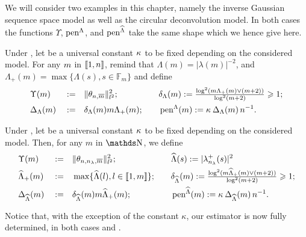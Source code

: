 We will consider two examples in this chapter, namely the inverse Gaussian sequence space model as well as the circular deconvolution model.
In both cases the functions $\Upsilon$, $\pen^{\Lambda}$, and $\pen^{\widehat{\Lambda}}$ take the same shape which we hence give here.
\begin{de}\label{freq:ge:shape:kn:de:pen:oo}
  Under , let be a universal constant $\cpen$ to be fixed depending on the considered model.
  For any $\Di$ in $\nset{1,\ssY}$, remind that $\Lambda(m) = \vert \lambda(m) \vert^{-2}$, and $\Lambda_{+}(m) = \max\{\Lambda(s), s \in \mathds{F}_{m} \}$ and define
  \begin{alignat*}{4}
  & \Upsilon(m) && := && \Vert \theta_{n, \overline{m}} \Vert_{l^{2}}^{2};  \quad && \cmiSv := \tfrac{\log^{2}(\Di\miSv \vee(\Di+2))}{\log^{2}(\Di+2)}\geq1;\\
  & \DipenSv && := && \cmiSv \Di \miSv; \quad && \penSv:= \penD.
  \end{alignat*}
  \assEnd
\end{de}
\begin{de}\label{freq:ge:shape:uk:de:pen:oo}
  Under , let be a universal constant $\cpen$ to be fixed depending on the considered model.
  Then, for any $m$ in $\N$, we define
  \begin{alignat*}{4}
  & \Upsilon(m) && := && \Vert \theta_{n, n_{\lambda}, \overline{m}}\Vert_{l^{2}}^{2}; && \quad \eiSv[(s)]:= \vert \hfedfmpI[(s)] \vert ^2\\
    & \meiSv && := && \max\{\eiSv[(l)],l\in\nset{1,\Di}\}; && \quad \cmeiSv:=\tfrac{\log^{2}(\Di\meiSv\vee(\Di+2))}{\log^{2}(\Di+2)}\geq1;\\
    &\DipeneSv && := && \cmeiSv \Di \meiSv;&& \quad \peneSv:= \peneD.
  \end{alignat*}
  \assEnd
\end{de}
Notice that, with the exception of the constant $\kappa$, our estimator is now fully determined, in both cases  and .


